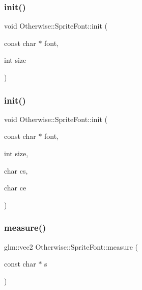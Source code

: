 \subsubsection{\texorpdfstring{init()}{init()}\hspace{0.1cm}{\footnotesize\ttfamily [1/2]}}
{\footnotesize\ttfamily void Otherwise\+::\+Sprite\+Font\+::init (\begin{DoxyParamCaption}\item[{const char $\ast$}]{font,  }\item[{int}]{size }\end{DoxyParamCaption})}

\mbox{\label{class_otherwise_1_1_sprite_font_af469b7a1b428e4758fa317c0b021c481}} 
\subsubsection{\texorpdfstring{init()}{init()}\hspace{0.1cm}{\footnotesize\ttfamily [2/2]}}
{\footnotesize\ttfamily void Otherwise\+::\+Sprite\+Font\+::init (\begin{DoxyParamCaption}\item[{const char $\ast$}]{font,  }\item[{int}]{size,  }\item[{char}]{cs,  }\item[{char}]{ce }\end{DoxyParamCaption})}

\mbox{\label{class_otherwise_1_1_sprite_font_a0674639c45766ae5fc4643d66d017e17}} 
\subsubsection{\texorpdfstring{measure()}{measure()}}
{\footnotesize\ttfamily glm\+::vec2 Otherwise\+::\+Sprite\+Font\+::measure (\begin{DoxyParamCaption}\item[{const char $\ast$}]{s }\end{DoxyParamCaption})}



